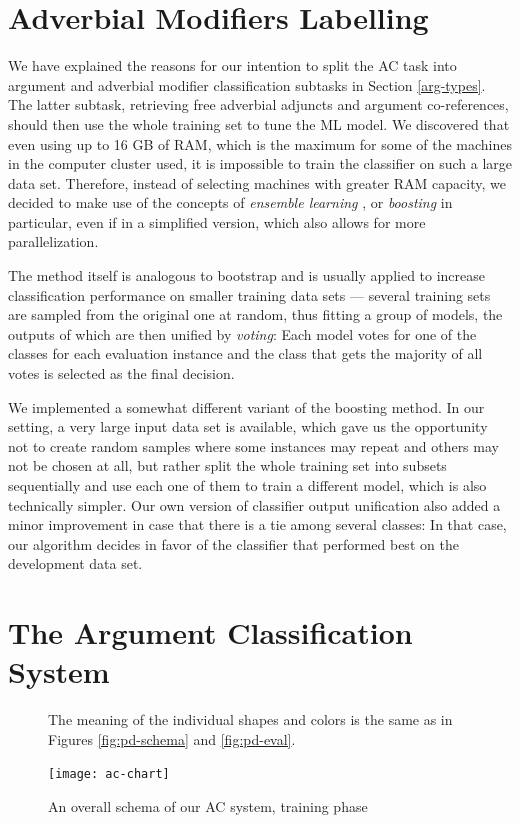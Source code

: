 \documentclass[12pt,notitlepage]{report}
\begin{document}
\section{Adverbial Modifiers Labelling}\label{ac-am}

We have explained the reasons for our intention to split the AC task into argument and adverbial modifier classification subtasks in Section \ref{arg-types}. The latter subtask, retrieving free adverbial adjuncts and argument co-references, should then use the whole training set to tune the ML model. We discovered that even using up to 16 GB of RAM, which is the maximum for some of the machines in the computer cluster used, it is impossible to train the classifier on such a large data set. Therefore, instead of selecting machines with greater RAM capacity, we decided to make use of the concepts of \emph{ensemble learning} \citep[p. 605ff.]{opitz99,hastie09}, or \emph{boosting} \citep[p. 321ff.]{witten05} in particular, even if in a simplified version, which also allows for more parallelization. 

The method itself is analogous to bootstrap and is usually applied to increase classification performance on smaller training data sets --- several training sets are sampled from the original one at random, thus fitting a group of models, the outputs of which are then unified by \emph{voting}: Each model votes for one of the classes for each evaluation instance and the class that gets the majority of all votes is selected as the final decision. 

We implemented a somewhat different variant of the boosting method. In our setting, a very large input data set is available, which gave us the opportunity not to create random samples where some instances may repeat and others may not be chosen at all, but rather split the whole training set into subsets sequentially and use each one of them to train a different model, which is also technically simpler. Our own version of classifier output unification also added a minor improvement in case that there is a tie among several classes: In that case, our algorithm decides in favor of the classifier that performed best on the development data set.

\section{The Argument Classification System}\label{ac-overview}

\begin{figure}[tbp]\footnotesize
\caption{An overall schema of our AC system, training phase}\label{fig:ac-schema}
\noindent The meaning of the individual shapes and colors is the same as in Figures \ref{fig:pd-schema} and \ref{fig:pd-eval}.
\begin{center}
\texttt{[image: ac-chart]}
\end{center}
\end{figure}
\end{document}
